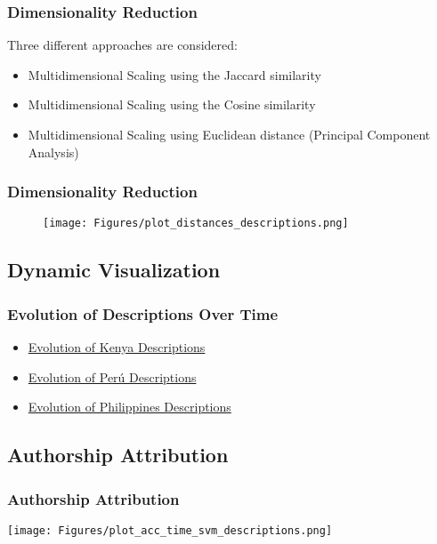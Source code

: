 \documentclass{beamer}
\begin{document}
\begin{frame}\frametitle{Dimensionality Reduction}
Three different approaches are considered:
\begin{itemize}
\item Multidimensional Scaling using the Jaccard similarity
\item Multidimensional Scaling using the Cosine similarity
\item Multidimensional Scaling using Euclidean distance (Principal Component
Analysis)
\end{itemize}
\end{frame}

\begin{frame}\frametitle{Dimensionality Reduction}
\begin{figure}
\texttt{[image: Figures/plot\_distances\_descriptions.png]}
\end{figure}
\end{frame}

\subsection{Dynamic Visualization}
\begin{frame}\frametitle{Evolution of Descriptions Over Time}
\begin{itemize}
\item \href{file:///Users/marcvalenti/TFM/img_gif/kenya/animation.gif}{Evolution of Kenya Descriptions}
\item \href{file:///Users/marcvalenti/TFM/img_gif/peru/animation.gif}{Evolution of Perú Descriptions}
\item \href{file:///Users/marcvalenti/TFM/img_gif/Philippines/animation_philippines.gif}{Evolution of Philippines Descriptions}
\end{itemize}
\end{frame}

\subsection{Authorship Attribution}
\begin{frame}\frametitle{Authorship Attribution}
\texttt{[image: Figures/plot\_acc\_time\_svm\_descriptions.png]}
\end{frame}
% 
\end{document}
